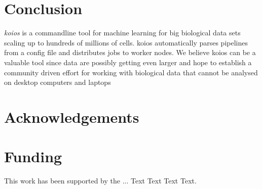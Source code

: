 \documentclass{bioinfo}
\begin{document}
\section{Conclusion}

\textit{koios} is a commandline tool for machine learning for big biological data sets scaling up to hundreds of millions of cells. koios automatically parses pipelines from a config file and distributes jobs to worker nodes. We believe koios can be a valuable tool since data are possibly getting even larger and hope to establish a community driven effort for working with biological data that cannot be analysed on desktop computers and laptops

\section*{Acknowledgements}

\section*{Funding}

This work has been supported by the ... Text Text  Text Text. \vspace*{-12pt}



\end{document}
